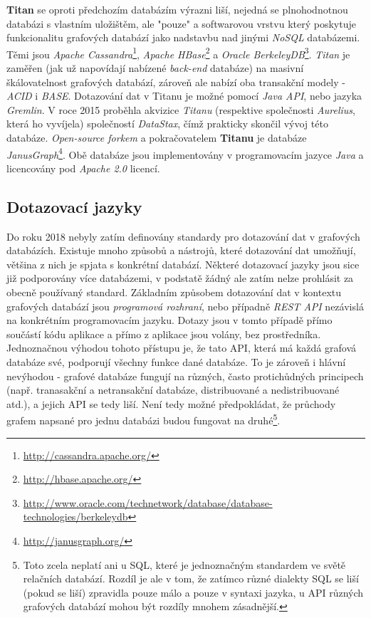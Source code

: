 \textbf{Titan} se oproti předchozím databázím výrazni liší, nejedná se plnohodnotnou databázi s vlastním uložištěm, ale "pouze" a softwarovou vrstvu který poskytuje funkcionalitu grafových databází jako nadstavbu nad jinými \textit{NoSQL} databázemi. Těmi jsou \textit{Apache Cassandra}\footnote{\url{http://cassandra.apache.org/}}, \textit{Apache HBase}\footnote{\url{http://hbase.apache.org/}} a \textit{Oracle BerkeleyDB}\footnote{\url{http://www.oracle.com/technetwork/database/database-technologies/berkeleydb}}. 
\textit{Titan} je zaměřen (jak už napovídají nabízené \textit{back-end} databáze) na masivní škálovatelnost grafových databází, zároveň ale nabízí oba transakční modely - \textit{ACID} i \textit{BASE}. Dotazování dat v Titanu je možné pomocí \textit{Java API}, nebo jazyka \textit{Gremlin}. V roce 2015 proběhla akvizice \textit{Titanu} (respektive společnosti \textit{Aurelius}, která ho vyvíjela) společností \textit{DataStax}, čímž prakticky skončil vývoj této databáze. \textit{Open-source forkem} a pokračovatelem\cite{Datami17} \textbf{Titanu} je databáze \textit{JanusGraph}\footnote{\url{http://janusgraph.org/}}. Obě databáze jsou implementovány v programovacím jazyce \textit{Java} a licencovány pod \textit{Apache 2.0} licencí. 


\subsection{Dotazovací jazyky}
\label{sec:gdb-jazyky}

Do roku 2018 nebyly zatím definovány standardy pro dotazování dat v grafových databázích. Existuje mnoho způsobů a nástrojů, které dotazování dat umožňují, většina z nich je spjata s konkrétní databází. Některé dotazovací jazyky jsou sice již podporovány více databázemi, v podstatě žádný ale zatím nelze prohlásit za obecně používaný standard. Základním způsobem dotazování dat v kontextu grafových databází jsou \textit{programová rozhraní}, nebo případně \textit{REST API} nezávislá na konkrétním programovacím jazyku. Dotazy jsou v tomto případě přímo součástí kódu aplikace a přímo z aplikace jsou volány, bez prostředníka. Jednoznačnou výhodou tohoto přístupu je, že tato API, která má každá grafová databáze své, podporují všechny funkce dané databáze. To je zároveň i hlávní nevýhodou - grafové databáze fungují na různých, často protichůdných principech (např. tranasakční a netransakční databáze, distribuované a nedistribuované atd.), a jejich API se tedy liší. Není tedy možné předpokládat, že průchody grafem napsané pro jednu databázi budou fungovat na druhé\footnote{Toto zcela neplatí ani u SQL, které je jednoznačným standardem ve světě relačních databází. Rozdíl je ale v tom, že zatímco různé dialekty SQL se liší (pokud se liší) zpravidla pouze málo a pouze v syntaxi jazyka, u API různých grafových databází mohou být rozdíly mnohem zásadnější.}.   

